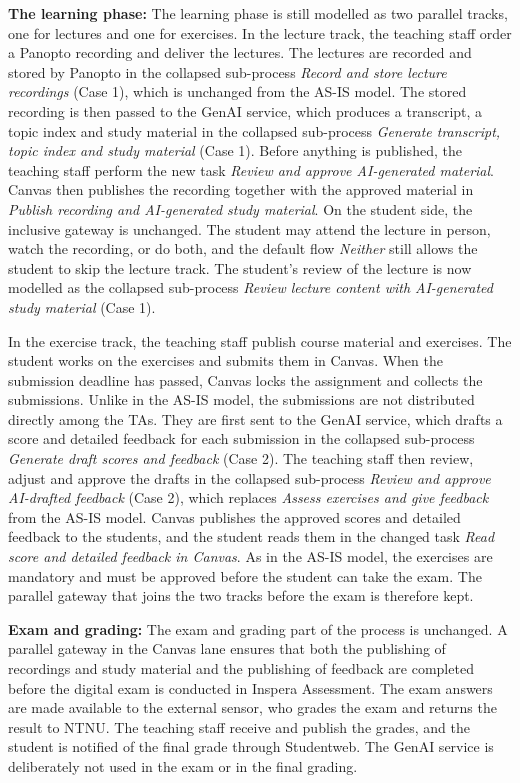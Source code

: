 \textbf{The learning phase:} The learning phase is still modelled as two parallel tracks, one for lectures and one for exercises. In the lecture track, the teaching staff order a Panopto recording and deliver the lectures. The lectures are recorded and stored by Panopto in the collapsed sub-process \textit{Record and store lecture recordings} (Case 1), which is unchanged from the AS-IS model. The stored recording is then passed to the GenAI service, which produces a transcript, a topic index and study material in the collapsed sub-process \textit{Generate transcript, topic index and study material} (Case 1). Before anything is published, the teaching staff perform the new task \textit{Review and approve AI-generated material}. Canvas then publishes the recording together with the approved material in \textit{Publish recording and AI-generated study material}. On the student side, the inclusive gateway is unchanged. The student may attend the lecture in person, watch the recording, or do both, and the default flow \textit{Neither} still allows the student to skip the lecture track. The student's review of the lecture is now modelled as the collapsed sub-process \textit{Review lecture content with AI-generated study material} (Case 1).

In the exercise track, the teaching staff publish course material and exercises. The student works on the exercises and submits them in Canvas. When the submission deadline has passed, Canvas locks the assignment and collects the submissions. Unlike in the AS-IS model, the submissions are not distributed directly among the TAs. They are first sent to the GenAI service, which drafts a score and detailed feedback for each submission in the collapsed sub-process \textit{Generate draft scores and feedback} (Case 2). The teaching staff then review, adjust and approve the drafts in the collapsed sub-process \textit{Review and approve AI-drafted feedback} (Case 2), which replaces \textit{Assess exercises and give feedback} from the AS-IS model. Canvas publishes the approved scores and detailed feedback to the students, and the student reads them in the changed task \textit{Read score and detailed feedback in Canvas}. As in the AS-IS model, the exercises are mandatory and must be approved before the student can take the exam. The parallel gateway that joins the two tracks before the exam is therefore kept.

\textbf{Exam and grading:} The exam and grading part of the process is unchanged. A parallel gateway in the Canvas lane ensures that both the publishing of recordings and study material and the publishing of feedback are completed before the digital exam is conducted in Inspera Assessment. The exam answers are made available to the external sensor, who grades the exam and returns the result to NTNU. The teaching staff receive and publish the grades, and the student is notified of the final grade through Studentweb. The GenAI service is deliberately not used in the exam or in the final grading.

